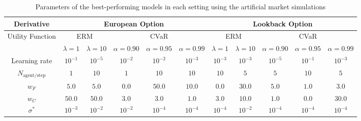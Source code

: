 \begin{table*}[htb]
    \caption{Parameters of the best-performing models in each setting using the artificial market simulations}
    \label{tab:tuning-results-sim}
    \centering
    \begin{tabular}{c||c|c|c|c|c||c|c|c|c|c}
        \hline
        Derivative                        & \multicolumn{5}{c||}{European Option} & \multicolumn{5}{c}{Lookback Option}                                                                                                                                                    \\\hline
        \multirow{2}{*}{Utility Function} & \multicolumn{2}{c|}{ERM}              & \multicolumn{3}{c||}{CVaR}          & \multicolumn{2}{c|}{ERM} & \multicolumn{3}{c}{CVaR}                                                                                              \\
                                          & $\lambda=1$                           & $\lambda=10$                        & $\alpha=0.90$            & $\alpha=0.95$            & $\alpha=0.99$ & $\lambda=1$ & $\lambda=10$ & $\alpha=0.90$ & $\alpha=0.95$ & $\alpha=0.99$ \\\hline\hline
        Learning rate                     & $10^{-1}$                             & $10^{-5}$                           & $10^{-2}$                & $10^{-2}$                & $10^{-3}$     & $10^{-3}$   & $10^{-3}$    & $10^{-5}$     & $10^{-1}$     & $10^{-3}$     \\
        $N_{\mathrm{agent/step}}$         & $1$                                   & $10$                                & $1$                      & $10$                     & $10$          & $10$        & $5$          & $5$           & $10$          & $5$           \\
        $w_F$                             & $5.0$                                 & $5.0$                               & $0.0$                    & $50.0$                   & $10.0$        & $0.0$       & $30.0$       & $5.0$         & $1.0$         & $3.0$         \\
        $w_C$                             & $50.0$                                & $50.0$                              & $3.0$                    & $3.0$                    & $1.0$         & $3.0$       & $10.0$       & $1.0$         & $0.0$         & $30.0$        \\
        $\sigma^{*}$                      & $10^{-3}$                             & $10^{-2}$                           & $10^{-2}$                & $10^{-4}$                & $10^{-4}$     & $10^{-4}$   & $10^{-2}$    & $10^{-4}$     & $10^{-4}$     & $10^{-4}$     \\

\end{tabular}
\end{table*}
